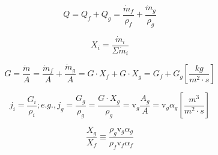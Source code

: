 \documentclass[12pt,fleqn]{report}
\begin{document}
\pagestyle{empty}
{\newpage
\clearpage
\samepage \begin{equation}Q = Q_{f} + Q_{g} = \frac{\dot{m}_{f}}{\rho_{f}} + \frac{\dot{m}_{g}}{\rho_{g}}
\end{equation}
}

{\newpage
\clearpage
\samepage \begin{equation}X_{i} =  \frac{\dot{m}_{i}}{\Sigma \dot{m}_{i}}
\end{equation}
}

{\newpage
\clearpage
\samepage \begin{equation}G =  \frac{\dot{m}}{A} = \frac{\dot{m}_{f}}{A} +
\frac{\dot{m}_{g}}{A} = G\cdot X_{f} +
G\cdot X_{g} = G_{f} + G_{g} \left[
\frac{kg}{m^{2} \cdot s} \right]
\end{equation}
}

{\newpage
\clearpage
\samepage \begin{equation}j_{i} = \frac{G_{i}}{\rho_{i}}; e.g.,   j_{g} = \frac{G_{g}}{\rho_{g}} = \frac{G\cdot X_{g}}{\rho_{g}} =
\mbox{v}_{g} \frac{A_{g}}{A} = \mbox{v}_{g} \alpha_{g} \left[ \frac{m^{3}}{m^{2} \cdot s} \right]
\end{equation}
}

{\newpage
\clearpage
\samepage \begin{equation}\frac{X_{g}}{X_{f}} \equiv \frac{\rho_{g} \mbox{v}_{g} \alpha_{g}}{\rho_{f} \mbox{v}_{f} \alpha_{f}}
\end{equation}
}
\end{document}
